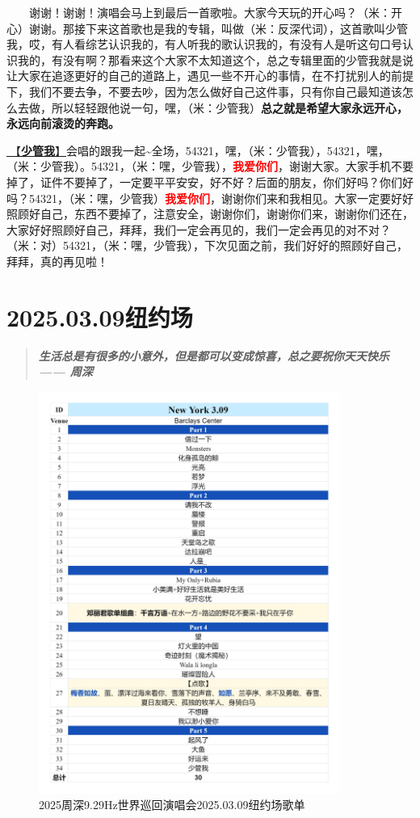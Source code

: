 \documentclass[]{ctexbook}
\begin{document}
  谢谢！谢谢！演唱会马上到最后一首歌啦。大家今天玩的开心吗？（米：开心）谢谢。那接下来这首歌也是我的专辑，叫做（米：反深代词），这首歌叫少管我，哎，有人看综艺认识我的，有人听我的歌认识我的，有没有人是听这句口号认识我的，有没有啊？那看来这个大家不太知道这个，总之专辑里面的少管我就是说让大家在追逐更好的自己的道路上，遇见一些不开心的事情，在不打扰别人的前提下，我们不要去争，不要去吵，因为怎么做好自己这件事，只有你自己最知道该怎么去做，所以轻轻跟他说一句，嘿，（米：少管我）\textbf{总之就是希望大家永远开心，永远向前滚烫的奔跑。}

\hyperref[watch-ur-manners]{🎵【\textbf{少管我}】}会唱的跟我一起\textasciitilde 全场，54321，嘿，（米：少管我），54321，嘿，（米：少管我）。54321，（米：嘿，少管我），\textbf{\textcolor{red}{我爱你们}}，谢谢大家。大家手机不要掉了，证件不要掉了，一定要平平安安，好不好？后面的朋友，你们好吗？你们好吗？54321，（米：嘿，少管我）\textbf{\textcolor{red}{我爱你们}}，谢谢你们来和我相见。大家一定要好好照顾好自己，东西不要掉了，注意安全，谢谢你们，谢谢你们来，谢谢你们还在，大家好好照顾好自己，拜拜，我们一定会再见的，我们一定会再见的对不对？（米：对）54321，（米：嘿，少管我），下次见面之前，我们好好的照顾好自己，拜拜，真的再见啦！

\chapter{2025.03.09纽约场}\label{NewYork-20250309}

\begin{quote}
\textbf{\emph{生活总是有很多的小意外，但是都可以变成惊喜，总之要祝你天天快乐------ 周深}}
\end{quote}

\begin{figure}

{\centering \includegraphics[width=280pt]{img/playlists/playlists-newyork-20250309} 

}

\caption{2025周深9.29Hz世界巡回演唱会2025.03.09纽约场歌单}\label{fig:unnamed-chunk-181}
\end{figure}
\end{document}

